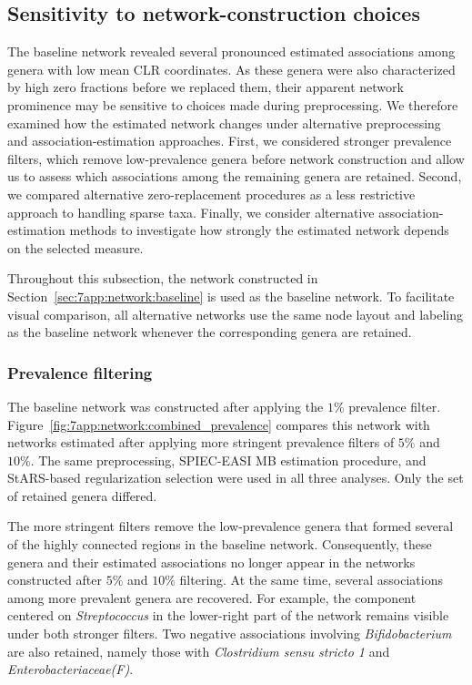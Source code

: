 \subsection{Sensitivity to network-construction choices}
\label{sec:7app:network:sensitivity}

The baseline network revealed several pronounced estimated associations among genera with low mean CLR coordinates. As these genera were also characterized by high zero fractions before we replaced them, their apparent network prominence may be sensitive to choices made during preprocessing. We therefore examined how the estimated network changes under alternative preprocessing and association-estimation approaches. First, we considered stronger prevalence filters, which remove low-prevalence genera before network construction and allow us to assess which associations among the remaining genera are retained. Second, we compared alternative zero-replacement procedures as a less restrictive approach to handling sparse taxa. Finally, we consider alternative association-estimation methods to investigate how strongly the estimated network depends on the selected measure.

Throughout this subsection, the network constructed in Section~\ref{sec:7app:network:baseline} is used as the baseline network. To facilitate visual comparison, all alternative networks use the same node layout and labeling as the baseline network whenever the corresponding genera are retained.

\subsubsection{Prevalence filtering}
\label{sec:7app:network:sensitivity:prevalence}

The baseline network was constructed after applying the $1\%$ prevalence filter. Figure~\ref{fig:7app:network:combined_prevalence} compares this network with networks estimated after applying more stringent prevalence filters of $5\%$ and $10\%$. The same preprocessing, SPIEC-EASI MB estimation procedure, and StARS-based regularization selection were used in all three analyses. Only the set of retained genera differed.

The more stringent filters remove the low-prevalence genera that formed several of the highly connected regions in the baseline network. Consequently, these genera and their estimated associations no longer appear in the networks constructed after $5\%$ and $10\%$ filtering. At the same time, several associations among more prevalent genera are recovered. For example, the component centered on \emph{Streptococcus} in the lower-right part of the network remains visible under both stronger filters. Two negative associations involving \emph{Bifidobacterium} are also retained, namely those with \emph{Clostridium sensu stricto 1} and \emph{Enterobacteriaceae(F)}.

